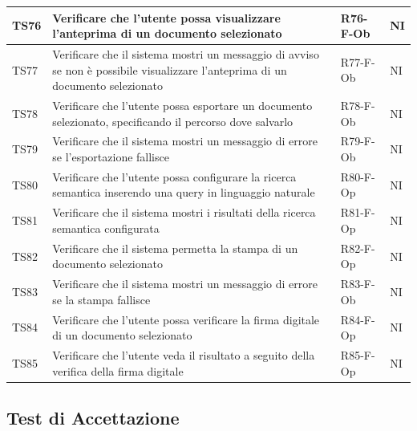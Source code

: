 \documentclass[a4paper,12pt]{article}
\begin{document}
\begin{longtable}{|M{1.2cm}|M{6.3cm}|M{2.5cm}|M{1.5cm}|}
                TS76 & Verificare che l'utente possa visualizzare l'anteprima di un documento selezionato & R76-F-Ob & NI \\
                \hline

                TS77 & Verificare che il sistema mostri un messaggio di avviso se non è possibile visualizzare l'anteprima di un documento selezionato & R77-F-Ob & NI \\
                \hline

                TS78 & Verificare che l'utente possa esportare un documento selezionato, specificando il percorso dove salvarlo & R78-F-Ob & NI \\
                \hline

                TS79 & Verificare che il sistema mostri un messaggio di errore se l'esportazione fallisce & R79-F-Ob & NI \\
                \hline

                TS80 & Verificare che l'utente possa configurare la ricerca semantica inserendo una query in linguaggio naturale & R80-F-Op & NI \\
                \hline

                TS81 & Verificare che il sistema mostri i risultati della ricerca semantica configurata & R81-F-Op & NI \\
                \hline

                TS82 & Verificare che il sistema permetta la stampa di un documento selezionato & R82-F-Op & NI \\
                \hline

                TS83 & Verificare che il sistema mostri un messaggio di errore se la stampa fallisce & R83-F-Ob & NI \\
                \hline

                TS84 & Verificare che l'utente possa verificare la firma digitale di un documento selezionato & R84-F-Op & NI \\
                \hline

                TS85 & Verificare che l'utente veda il risultato a seguito della verifica della firma digitale & R85-F-Op & NI \\
                \hline

            \end{longtable}

        \subsection{Test di Accettazione}
        
\end{document}
